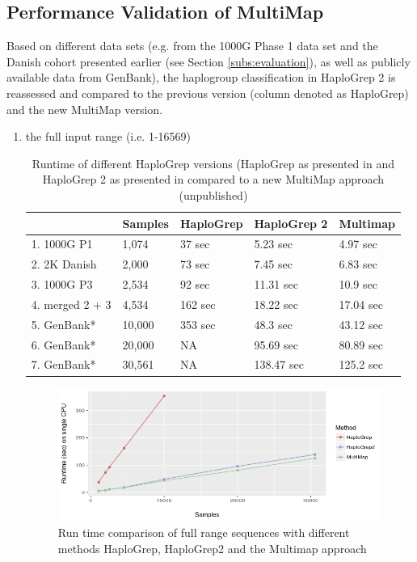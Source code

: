 \subsection{Performance Validation of MultiMap}
Based on different data sets (e.g. from the 1000G Phase 1 data set and the Danish cohort presented earlier (see Section \ref{subs:evaluation}), as well as publicly available data from GenBank), the haplogroup classification in HaploGrep 2 is reassessed and compared to the previous version (column denoted as HaploGrep) and the new MultiMap version. 
\begin{enumerate}[label=(\alph*)]
\item  the full input range (i.e. 1-16569)
\begin{table}[H]
\centering
\caption{Runtime of different HaploGrep versions (HaploGrep as presented in \cite{Kloss-Brandstatter2011} and HaploGrep 2 as presented in \cite{Weissensteiner2016a} compared to a new MultiMap approach (unpublished)}
\label{hg:runtime1}
\begin{tabular}{|l|l|l|l|l|}
\hline
             & Samples & HaploGrep & HaploGrep 2 & Multimap \\ \hline
1. 1000G P1  & 1,074   & 37 sec  & 5.23 sec       & 4.97  sec        \\ \hline
2. 2K Danish & 2,000   & 73 sec & 7.45  sec      & 6.83  sec       \\ \hline
3. 1000G P3  & 2,534   & 92 sec & 11.31 sec      & 10.9  sec        \\ \hline
4. merged 2 + 3 & 4,534   & 162 sec  & 18.22   sec     & 17.04 sec        \\ \hline
5. GenBank* & 10,000   & 353 sec & 48.3  sec      & 43.12 sec         \\ \hline
6. GenBank*  & 20,000   & NA & 95.69 sec     & 80.89 sec         \\ \hline
7. GenBank*  & 30,561   & NA & 138.47 sec     & 125.2 sec        \\ \hline
\end{tabular}
\end{table}

\begin{figure}[!ht]
    \centering
    \includegraphics[width=1\textwidth]{images/multimap.png}
    \caption[Run time comparison of HaploGrep versions]{Run time comparison of full range sequences with different methods HaploGrep, HaploGrep2 and the Multimap approach} 
    \label{hg:mutlimap}
\end{figure}


\end{enumerate}
